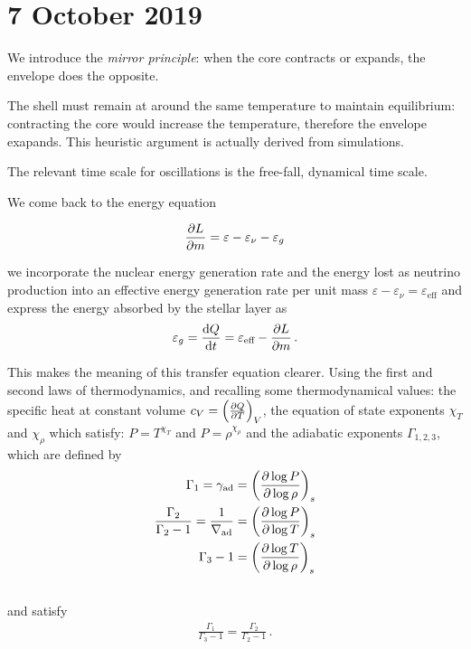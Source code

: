 \documentclass[main.tex]{subfiles}
\begin{document}
\section*{7 October 2019}



We introduce the \emph{mirror principle}: when the core contracts or expands, the envelope does the opposite.

The shell must remain at around the same temperature to maintain equilibrium: contracting the core would increase the temperature, therefore the envelope exapands.
This heuristic argument is actually derived from simulations.

The relevant time scale for oscillations is the free-fall, dynamical time scale.

We come back to the energy equation

\begin{equation}
  \pdv{L}{m} = \varepsilon - \varepsilon_\nu - \varepsilon_g
\end{equation}

we incorporate the nuclear energy generation rate and the energy lost as neutrino production into an effective energy generation rate per unit mass \(\varepsilon - \varepsilon_\nu = \varepsilon_{\text{eff}} \) and express the energy absorbed by the stellar layer as 
%
\begin{align}
 \varepsilon_g = \dv{Q}{t} = \varepsilon_{\text{eff}} - \pdv{L}{m}
\,.
\end{align}
%

This makes the meaning of this transfer equation clearer.
Using the first and second laws of thermodynamics, and recalling some thermodynamical values: the specific heat at constant volume \(c_V = \qty(\pdv{Q}{T})_V \), the equation of state exponents \(\chi_T \) and \(\chi_\rho
\) which satisfy: \(P = T^{ \chi_{T}}\) and \(P = \rho^{\chi_{\rho }}\) and the adiabatic exponents \(\Gamma_{1,2,3}\), which are defined by 
%
\begin{subequations}
\begin{align}
\Gamma_1 = \gamma_{\text{ad}} &= \qty(\pdv{\log P}{\log \rho })_{s}  \\
\frac{\Gamma_2 }{\Gamma_2 -1} = \frac{1}{\nabla _{\text{ad}}} &= \qty(\pdv{\log P}{\log T})_{s}  \\
\Gamma_3 -1 &= \qty(\pdv{\log T}{\log \rho })_{s}  \\
\,
\end{align}
\end{subequations}
%
and satisfy 
%
\begin{align}
\frac{\Gamma_1 }{\Gamma_3 -1} = \frac{\Gamma_2 }{\Gamma_2 -1}
\,.
\end{align}
\end{document}
